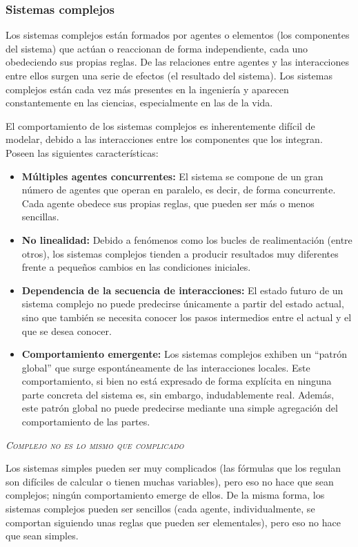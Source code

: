 \documentclass[10pt,a4paper,spanish]{article}
\newcommand{\sombreado}[2]{
  \begin{shaded}
    \begin{center} \emph{\textsc{#1}} \end{center}
    \noindent #2\\
  \end{shaded}
}
\begin{document}
\subsubsection{Sistemas complejos}

Los sistemas complejos están formados por agentes o elementos (los componentes del sistema) que actúan o reaccionan de forma independiente, cada uno obedeciendo sus propias reglas. De las relaciones entre agentes y las interacciones entre ellos surgen una serie de efectos (el resultado del sistema). Los sistemas complejos están cada vez más presentes en la ingeniería y aparecen constantemente en las ciencias, especialmente en las de la vida.

El comportamiento de los sistemas complejos es inherentemente difícil de modelar, debido a las interacciones entre los componentes que los integran. Poseen las siguientes características:

\begin{itemize}
    \item \textbf{Múltiples agentes concurrentes:} El sistema se compone de un gran número de agentes que operan en paralelo, es decir, de forma concurrente. Cada agente obedece sus propias reglas, que pueden ser más o menos sencillas.
    \item \textbf{No linealidad:} Debido a fenómenos como los bucles de realimentación (entre otros), los sistemas complejos tienden a producir resultados muy diferentes frente a pequeños cambios en las condiciones iniciales.
    \item \textbf{Dependencia de la secuencia de interacciones:} El estado futuro de un sistema complejo no puede predecirse únicamente a partir del estado actual, sino que también se necesita conocer los pasos intermedios entre el actual y el que se desea conocer.
    \item \textbf{Comportamiento emergente:} Los sistemas complejos exhiben un ``patrón global'' que surge espontáneamente de las interacciones locales. Este comportamiento, si bien no está expresado de forma explícita en ninguna parte concreta del sistema es, sin embargo, indudablemente real. Además, este patrón global no puede predecirse mediante una simple agregación del comportamiento de las partes. 
\end{itemize}

\sombreado{Complejo no es lo mismo que complicado}{Los sistemas simples pueden ser muy complicados (las fórmulas que los regulan son difíciles de calcular o tienen muchas variables), pero eso no hace que sean complejos; ningún comportamiento emerge de ellos. De la misma forma, los sistemas complejos pueden ser sencillos (cada agente, individualmente, se comportan siguiendo unas reglas que pueden ser elementales), pero eso no hace que sean simples.}
\end{document}
